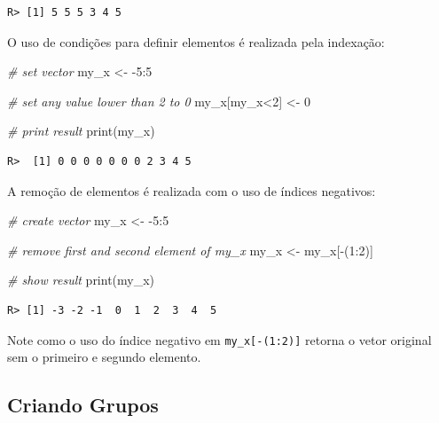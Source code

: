 \documentclass[
  11pt,
]{book}
\newenvironment{Shaded}{\begin{snugshade}}{\end{snugshade}}
\newcommand{\CommentTok}[1]{\textcolor[rgb]{0.37,0.37,0.37}{\textit{#1}}}
\newcommand{\DecValTok}[1]{\textcolor[rgb]{0.06,0.06,0.06}{#1}}
\newcommand{\FunctionTok}[1]{\textcolor[rgb]{0,0,0}{#1}}
\newcommand{\NormalTok}[1]{#1}
\newcommand{\OtherTok}[1]{\textcolor[rgb]{0.37,0.37,0.37}{#1}}
\newcommand{\SpecialCharTok}[1]{\textcolor[rgb]{0,0,0}{#1}}
\begin{document}
\begin{verbatim}
R> [1] 5 5 5 3 4 5
\end{verbatim}

O uso de condições para definir elementos é realizada pela indexação:

\begin{Shaded}
\begin{Highlighting}[]
\CommentTok{\# set vector}
\NormalTok{my\_x }\OtherTok{\textless{}{-}} \SpecialCharTok{{-}}\DecValTok{5}\SpecialCharTok{:}\DecValTok{5}

\CommentTok{\# set any value lower than 2 to 0}
\NormalTok{my\_x[my\_x}\SpecialCharTok{\textless{}}\DecValTok{2}\NormalTok{] }\OtherTok{\textless{}{-}} \DecValTok{0}

\CommentTok{\# print result}
\FunctionTok{print}\NormalTok{(my\_x)}
\end{Highlighting}
\end{Shaded}

\begin{verbatim}
R>  [1] 0 0 0 0 0 0 0 2 3 4 5
\end{verbatim}

A remoção de elementos é realizada com o uso de índices negativos:

\begin{Shaded}
\begin{Highlighting}[]
\CommentTok{\# create vector}
\NormalTok{my\_x }\OtherTok{\textless{}{-}} \SpecialCharTok{{-}}\DecValTok{5}\SpecialCharTok{:}\DecValTok{5}

\CommentTok{\# remove first and second element of my\_x}
\NormalTok{my\_x }\OtherTok{\textless{}{-}}\NormalTok{ my\_x[}\SpecialCharTok{{-}}\NormalTok{(}\DecValTok{1}\SpecialCharTok{:}\DecValTok{2}\NormalTok{)]}

\CommentTok{\# show result}
\FunctionTok{print}\NormalTok{(my\_x)}
\end{Highlighting}
\end{Shaded}

\begin{verbatim}
R> [1] -3 -2 -1  0  1  2  3  4  5
\end{verbatim}

Note como o uso do índice negativo em \texttt{my\_x{[}-(1:2){]}} retorna o vetor original sem o primeiro e segundo elemento.

\hypertarget{criando-grupos}{%
\subsection{Criando Grupos}\label{criando-grupos}}
\end{document}
